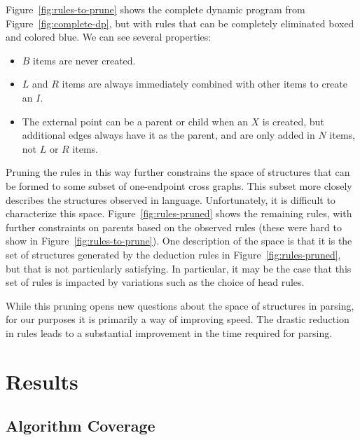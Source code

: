 Figure~\ref{fig:rules-to-prune} shows the complete dynamic program from Figure~\ref{fig:complete-dp}, but with rules that can be completely eliminated boxed and colored blue.
We can see several properties:

\begin{itemize}
  \item $B$ items are never created.
  \item $L$ and $R$ items are always immediately combined with other items to create an $I$.
  \item The external point can be a parent or child when an $X$ is created, but additional edges always have it as the parent, and are only added in $N$ items, not $L$ or $R$ items.
\end{itemize}

Pruning the rules in this way further constrains the space of structures that can be formed to some subset of one-endpoint cross graphs.
This subset more closely describes the structures observed in language.
Unfortunately, it is difficult to characterize this space.
Figure~\ref{fig:rules-pruned} shows the remaining rules, with further constraints on parents based on the observed rules (these were hard to show in Figure~\ref{fig:rules-to-prune}).
One description of the space is that it is the set of structures generated by the deduction rules in Figure~\ref{fig:rules-pruned}, but that is not particularly satisfying.
In particular, it may be the case that this set of rules is impacted by variations such as the choice of head rules.

While this pruning opens new questions about the space of structures in parsing, for our purposes it is primarily a way of improving speed.
The drastic reduction in rules leads to a substantial improvement in the time required for parsing.

\section{Results}

\subsection{Algorithm Coverage} \label{sec:results-coverage}

